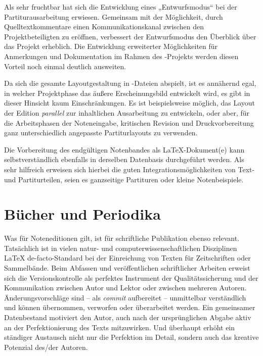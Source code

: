 \documentclass[DIV=12]{scrreprt}
\begin{document}
Als sehr fruchtbar hat sich die Entwicklung eines „Entwurfsmodus“ bei der Partiturausarbeitung erwiesen.
Gemeinsam mit der Möglichkeit, durch Quelltextkommentare einen Kommunikationskanal zwischen den Projektbeteiligten zu eröffnen, verbessert der Entwurfsmodus den Überblick über das Projekt erheblich.
Die Entwicklung erweiterter Möglichkeiten für Anmerkungen und Dokumentation im Rahmen des -Projekts werden diesen Vorteil noch einmal deutlich ausweiten.

Da sich die gesamte Layoutgestaltung in -Dateien abspielt, ist es annähernd egal, in welcher Projektphase das äußere Erscheinungsbild entwickelt wird, es gibt in dieser Hinsicht kaum Einschränkungen.
Es ist beispielsweise möglich, das Layout der Edition \emph{parallel} zur inhaltlichen Ausarbeitung zu entwickeln, oder aber, für die Arbeitsphasen der Noteneingabe, kritischen Revision und Druckvorbereitung ganz unterschiedlich angepasste Partiturlayouts zu verwenden.

Die Vorbereitung des endgültigen Notenbandes als LaTeX-Dokument(e) kann selbstverständlich ebenfalls in derselben Datenbasis durchgeführt werden.
Als sehr hilfreich erweisen sich hierbei die guten Integrationsmöglichkeiten von Text- und Partiturteilen, seien es ganzseitige Partituren oder kleine Notenbeispiele.

\section{Bücher und Periodika}
\label{sec:pt_books-periodicals}
Was für Noteneditionen gilt, ist für schriftliche Publikation ebenso relevant.
Tatsächlich ist in vielen natur- und computerwissenschaftlichen Disziplinen \LaTeX{} de-facto-Standard bei der Einreichung von Texten für Zeitschriften oder Sammelbände.
Beim Abfassen und veröffentlichen schriftlicher Arbeiten erweist sich die Versionskontrolle als perfektes Instrument der Qualitätssicherung und der Kommunikation zwischen Autor und Lektor oder zwischen mehreren Autoren.
Änderungsvorschläge sind -- als \emph{commit} aufbereitet -- unmittelbar verständlich und können übernommen, verworfen oder überarbeitet werden.
Ein gemeinsamer Datenbestand motiviert den Autor, auch nach der ursprünglichen Abgabe aktiv an der Perfektionierung des Texts mitzuwirken.
Und überhaupt erhöht ein ständiger Austausch nicht nur die Perfektion im Detail, sondern auch das kreative Potenzial des/der Autoren.
\end{document}
